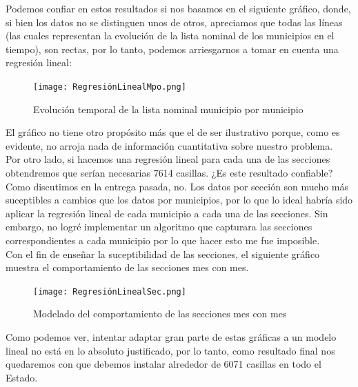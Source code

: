 \documentclass[12pt,letterpaper]{article}
\begin{document}
Podemos confiar en estos resultados si nos basamos en el siguiente gráfico, donde, si bien los datos no se distinguen unos de otros, apreciamos que todas las líneas (las cuales representan la evolución de la lista nominal de los municipios en el tiempo), son rectas, por lo tanto, podemos arriesgarnos a tomar en cuenta una regresión lineal:
\begin{figure}[H]
    \centering
    \texttt{[image: RegresiónLinealMpo.png]}
    \caption{Evolución temporal de la lista nominal municipio por municipio}
    \label{fig:my_label}
\end{figure}
El gráfico no tiene otro propósito más que el de ser ilustrativo porque, como es evidente, no arroja nada de información cuantitativa sobre nuestro problema.\\

Por otro lado, si hacemos una regresión lineal para cada una de las secciones obtendremos que serían necesarias 7614 casillas. ¿Es este resultado confiable? Como discutimos en la entrega pasada, no. Los datos por sección son mucho más suceptibles a cambios que los datos por municipios, por lo que lo ideal habría sido aplicar la regresión lineal de cada municipio a cada una de las secciones. Sin embargo, no logré implementar un algoritmo que capturara las secciones correspondientes a cada municipio por lo que hacer esto me fue imposible.\\

Con el fin de enseñar la suceptibilidad de las secciones, el siguiente gráfico muestra el comportamiento de las secciones mes con mes.
\begin{figure}[H]
    \centering
    \texttt{[image: RegresiónLinealSec.png]}
    \caption{Modelado del comportamiento de las secciones mes con mes}
    \label{fig:my_label}
\end{figure}
Como podemos ver, intentar adaptar gran parte de estas gráficas a un modelo lineal no está en lo absoluto justificado, por lo tanto, como resultado final nos quedaremos con que debemos instalar alrededor de 6071 casillas en todo el Estado. \\
\end{document}
